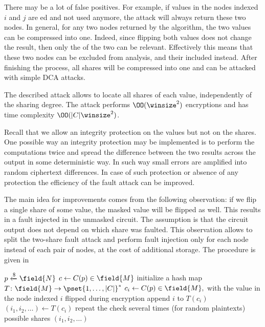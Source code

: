 \begin{remark}
There may be a lot of false positives. For example, if values in the nodes indexed $i$ and $j$ are \txor{}ed and not used anymore, the attack will always return these two nodes. In general, for any two nodes returned by the algorithm, the two values can be compressed into one. Indeed, since flipping both values does not change the result, then only the \txor{} of the two can be relevant. Effectively this means that these two nodes can be excluded from analysis, and their \txor{} included instead. After finishing the process, all shares will be compressed into one and can be attacked with simple DCA attacks.
\end{remark}

The described attack allows to locate all shares of each value, independently of the sharing degree. The attack performs $\OO(\winsize^2)$ encryptions and has time complexity $\OO(|C|\winsize^2)$.




Recall that we allow an integrity protection on the values but not on the shares. One possible way an integrity protection may be implemented is to perform the computations twice and spread the difference between the two results across the output in some deterministic way. In such way small errors are amplified into random ciphertext differences. In case of such protection or absence of any protection the efficiency of the fault attack can be improved.

The main idea for improvements comes from the following observation: if we flip a single share of some value, the masked value will be flipped as well. This results in a fault injected in the unmasked circuit. The assumption is that the circuit output does not depend on which share was faulted. This observation allows to split the two-share fault attack and perform fault injection only for each node instead of each pair of nodes, at the cost of additional storage. The procedure is given in~

\begin{algorithm}[ht]

\begin{algorithmic}[1]
    \State $p \xleftarrow{\$} \field{N}$
    \State $c \gets C(p) \in \field{M}$
    \State initialize a hash map $T\colon \field{M} \to \pset{1, \ldots, |C|}^*$
        \State $c_{i} \gets C(p) \in \field{M},$ with the value in the node indexed $i$
        \Statex \hspace{0.5cm} flipped during encryption
        \State append $i$ to $T(c_i)$
            \State $(i_1, i_2, \ldots) \gets T(c_i)$
            \State repeat the check several times (for random plaintexts)
            \State \Return \textsf{possible shares $(i_1, i_2, \ldots)$}
        \EndIf
    \EndFor
\end{algorithmic}
\end{algorithm}

